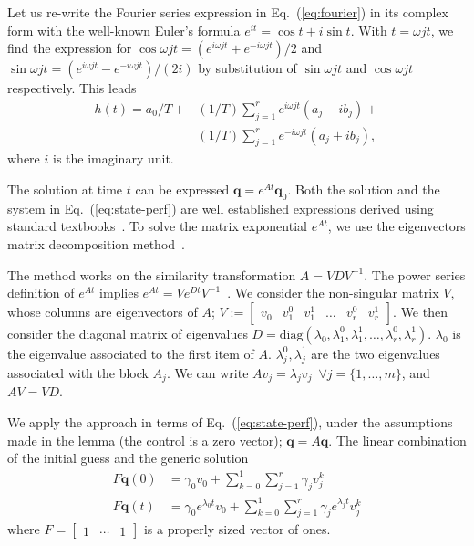 \documentclass[letterpaper,10pt,journal,twoside]{IEEEtran}
\theoremstyle{definition}
\begin{document}
Let us re-write the Fourier series expression in Eq.~(\ref{eq:fourier}) in its complex form with the well-known Euler's formula $e^{it}=\cos{t}+i\sin{t}$. With $t=\omega jt$, we find the expression for $\cos{\omega jt}=(e^{i\omega jt}+e^{-i\omega jt})/2$ and $\sin{\omega jt}=(e^{i\omega jt}-e^{-i\omega jt})/(2i)$ by substitution of $\sin{\omega jt}$ and $\cos{\omega jt}$ respectively. This leads~\cite{kuo1967automatic}
\begin{equation}\begin{split}\label{eq:proof-complex}
  h(t)=a_0/T+&(1/T)\sum_{j=1}^{r}{e^{i\omega jt}(a_j-ib_j)}+\\&(1/T)\sum_{j=1}^{r}{e^{-i\omega jt}(a_j+ib_j)},
 \end{split}\end{equation}
where $i$ is the imaginary unit. 

The solution at time $t$ can be expressed $\mathbf{q}=e^{At}\mathbf{q}_0$. Both the solution and the system in Eq.~(\ref{eq:state-perf}) are well established expressions derived using standard textbooks~\cite{kuo1967automatic, ogata2002modern}. To solve the matrix exponential $e^{At}$, we use the eigenvectors matrix decomposition method~\cite{moler2003nineteen}.

The method works on the similarity transformation $A=VDV^{-1}$. The power series definition of $e^{At}$ implies $e^{At}=Ve^{Dt}V^{-1}$~\cite{moler2003nineteen}. We consider the non-singular matrix $V$, whose columns are eigenvectors of $A$; $V:=\begin{bmatrix}v_0 & v_1^0 & v_1^1 & \dots & v_r^0 & v_r^1\end{bmatrix}$. We then consider the diagonal matrix of eigenvalues $D=\mathrm{diag}{(\lambda_0,\lambda_1^0,\lambda_1^1,\dots,\lambda_r^0,\lambda_r^1)}$. $\lambda_0$ is the eigenvalue associated to the first item of $A$. $\lambda_j^0,\lambda_j^1$ are the two eigenvalues associated with the block $A_j$. We can write $Av_j=\lambda_jv_j\,\,\,\forall j=\{1,\dots,m\}$, and $AV=VD$. 

We apply the approach in terms of Eq.~(\ref{eq:state-perf}), under the assumptions made in the lemma (the control is a zero vector); $\dot{\mathbf{q}}=A\mathbf{q}$. The linear combination of the initial guess and the generic solution
\begin{equation}\label{eq:proof-comb}\begin{split}
  F\mathbf{q}(0)&=\gamma_0 v_0+\sum_{k=0}^{1}{\sum_{j=1}^{r}{\gamma_j v_j^k}}\\
  F\mathbf{q}(t)&=\gamma_0 e^{\lambda_0 t} v_0+\sum_{k=0}^{1}{\sum_{j=1}^{r}{\gamma_j e^{\lambda_j t} v_j^k}}
\end{split}\end{equation}
where $F=\begin{bmatrix}1 & \cdots & 1\end{bmatrix}$ is a properly sized vector of ones. 
\end{document}
